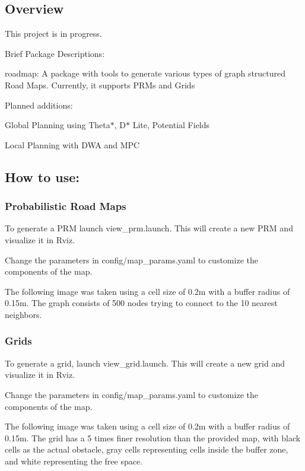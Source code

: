 \subsection*{Overview}

This project is in progress.

Brief Package Descriptions\+:
\begin{DoxyItemize}
\item {\ttfamily roadmap}\+: A package with tools to generate various types of graph structured Road Maps. Currently, it supports P\+R\+Ms and Grids
\end{DoxyItemize}

Planned additions\+:
\begin{DoxyItemize}
\item Global Planning using Theta$\ast$, D$\ast$ Lite, Potential Fields
\item Local Planning with D\+WA and M\+PC
\end{DoxyItemize}

\subsection*{How to use\+:}

\subsubsection*{Probabilistic Road Maps}

To generate a P\+RM launch {\ttfamily view\+\_\+prm.\+launch}. This will create a new P\+RM and visualize it in Rviz.

Change the parameters in {\ttfamily config/map\+\_\+params.\+yaml} to customize the components of the map.

The following image was taken using a cell size of 0.\+2m with a buffer radius of 0.\+15m. The graph consists of 500 nodes trying to connect to the 10 nearest neighbors. 

\subsubsection*{Grids}

To generate a grid, launch {\ttfamily view\+\_\+grid.\+launch}. This will create a new grid and visualize it in Rviz.

Change the parameters in {\ttfamily config/map\+\_\+params.\+yaml} to customize the components of the map.

The following image was taken using a cell size of 0.\+2m with a buffer radius of 0.\+15m. The grid has a 5 times finer resolution than the provided map, with black cells as the actual obstacle, gray cells representing cells inside the buffer zone, and white representing the free space.

 